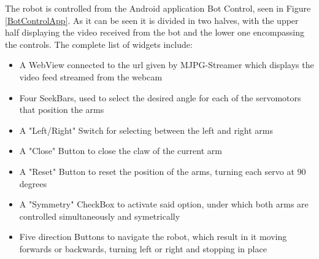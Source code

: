 The robot is controlled from the Android application Bot Control, seen in Figure \ref{BotControlApp}. As it can be seen it is divided in two halves, with the upper half displaying the video received from the bot and the lower one encompassing the controls. The complete list of widgets include:

	\begin{itemize}
	\item A WebView connected to the url given by MJPG-Streamer which displays the video feed streamed from the webcam

	\item Four SeekBars, used to select the desired angle for each of the servomotors that position the arms

	\item A "Left/Right" Switch for selecting between the left and right arms

	\item A "Close" Button to close the claw of the current arm

	\item A "Reset" Button to reset the position of the arms, turning each servo at 90 degrees

	\item A "Symmetry" CheckBox to activate said option, under which both arms are controlled simultaneously and symetrically

	\item Five direction Buttons to navigate the robot, which result in it moving forwards or backwards, turning left or right and stopping in place

	\end{itemize}
 

